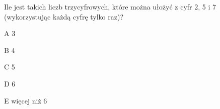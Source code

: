 \begin{tresc}
Ile jest takich liczb trzycyfrowych, które można ułożyć z cyfr 2, 5 i 7 (wykorzystując każdą cyfrę tylko raz)?
\end{tresc}
\begin{wariant}{A} 3 \end{wariant}
\begin{wariant}{B} 4 \end{wariant}
\begin{wariant}{C} 5 \end{wariant}
\begin{wariant}{D} 6 \end{wariant}
\begin{wariant}{E} więcej niż 6 \end{wariant}
